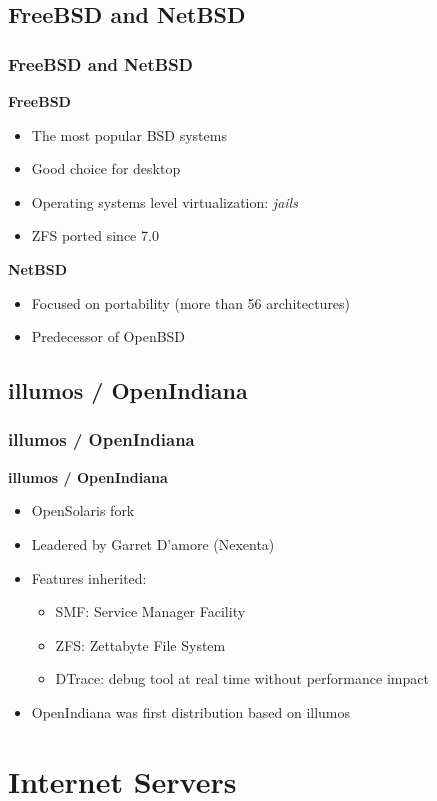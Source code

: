 \documentclass{beamer}
\begin{document}
  \subsection{FreeBSD and NetBSD}
  \begin{frame}
    \frametitle{FreeBSD and NetBSD}
    \textbf{FreeBSD}
    \begin{itemize}
      \item The most popular BSD systems
      \item Good choice for desktop
      \item Operating systems level virtualization: \textit{jails}
      \item ZFS ported since 7.0
    \end{itemize}
    \textbf{NetBSD}
    \begin{itemize}
      \item Focused on portability (more than 56 architectures)
      \item Predecessor of OpenBSD
    \end{itemize}
  \end{frame}
  
  \subsection{illumos / OpenIndiana}
  \begin{frame}
    \frametitle{illumos / OpenIndiana}
    \textbf{illumos / OpenIndiana}
    \begin{itemize}
      \item OpenSolaris fork
      \item Leadered by Garret D'amore (Nexenta)
      \item Features inherited:
        \begin{itemize}
          \item SMF: Service Manager Facility
          \item ZFS: Zettabyte File System
          \item DTrace: debug tool at real time without performance impact
        \end{itemize}
      \item OpenIndiana was first distribution based on illumos
    \end{itemize}
  \end{frame}


\section{Internet Servers}
\end{document}
